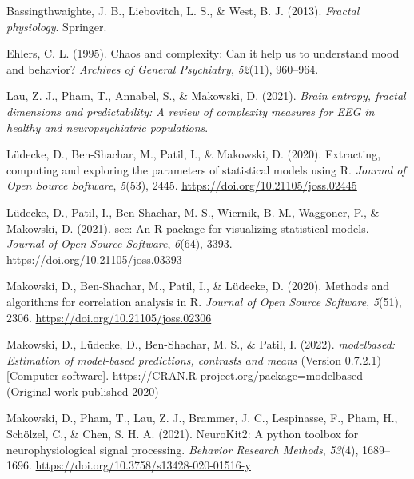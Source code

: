 \documentclass[
  man]{apa6}
\newlength{\cslhangindent}
\newlength{\cslentryspacingunit} %
\newenvironment{CSLReferences}[2] %
 {%
  \setlength{\parindent}{0pt}
  \ifodd #1
  \let\oldpar\par
  \def\par{\hangindent=\cslhangindent\oldpar}
  \fi
  \setlength{\parskip}{#2\cslentryspacingunit}
 }%
 {}
\begin{document}
\hypertarget{refs}{}
\begin{CSLReferences}{1}{0}
\leavevmode{}%
Bassingthwaighte, J. B., Liebovitch, L. S., \& West, B. J. (2013). \emph{Fractal physiology}. Springer.

\leavevmode{}%
Ehlers, C. L. (1995). Chaos and complexity: Can it help us to understand mood and behavior? \emph{Archives of General Psychiatry}, \emph{52}(11), 960--964.

\leavevmode{}%
Lau, Z. J., Pham, T., Annabel, S., \& Makowski, D. (2021). \emph{Brain entropy, fractal dimensions and predictability: A review of complexity measures for EEG in healthy and neuropsychiatric populations}.

\leavevmode{}%
Lüdecke, D., Ben-Shachar, M., Patil, I., \& Makowski, D. (2020). Extracting, computing and exploring the parameters of statistical models using {R}. \emph{Journal of Open Source Software}, \emph{5}(53), 2445. \url{https://doi.org/10.21105/joss.02445}

\leavevmode{}%
Lüdecke, D., Patil, I., Ben-Shachar, M. S., Wiernik, B. M., Waggoner, P., \& Makowski, D. (2021). {see}: An {R} package for visualizing statistical models. \emph{Journal of Open Source Software}, \emph{6}(64), 3393. \url{https://doi.org/10.21105/joss.03393}

\leavevmode{}%
Makowski, D., Ben-Shachar, M., Patil, I., \& Lüdecke, D. (2020). Methods and algorithms for correlation analysis in {R}. \emph{Journal of Open Source Software}, \emph{5}(51), 2306. \url{https://doi.org/10.21105/joss.02306}

\leavevmode{}%
Makowski, D., Lüdecke, D., Ben-Shachar, M. S., \& Patil, I. (2022). \emph{{modelbased}: Estimation of model-based predictions, contrasts and means} (Version 0.7.2.1) {[}Computer software{]}. \url{https://CRAN.R-project.org/package=modelbased} (Original work published 2020)

\leavevmode{}%
Makowski, D., Pham, T., Lau, Z. J., Brammer, J. C., Lespinasse, F., Pham, H., Schölzel, C., \& Chen, S. H. A. (2021). {NeuroKit}2: A python toolbox for neurophysiological signal processing. \emph{Behavior Research Methods}, \emph{53}(4), 1689--1696. \url{https://doi.org/10.3758/s13428-020-01516-y}

\end{CSLReferences}


\clearpage
\renewcommand{\listfigurename}{Figure captions}
\end{document}
